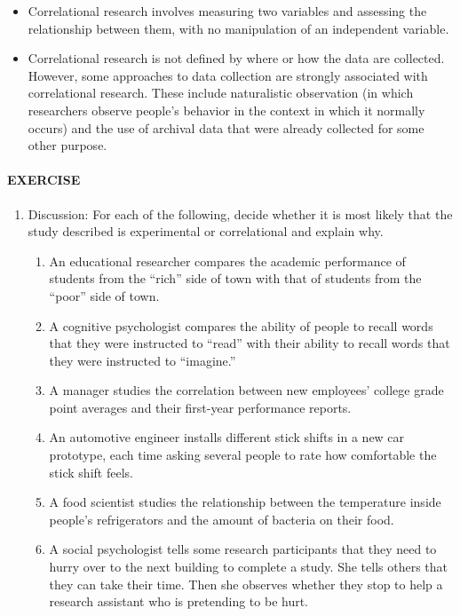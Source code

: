 \documentclass[
]{krantz}
\providecommand{\tightlist}{%
  \setlength{\itemsep}{0pt}\setlength{\parskip}{0pt}}
\begin{document}
\begin{itemize}
\tightlist
\item
  Correlational research involves measuring two variables and assessing the relationship between them, with no manipulation of an independent variable.
\item
  Correlational research is not defined by where or how the data are collected. However, some approaches to data collection are strongly associated with correlational research. These include naturalistic observation (in which researchers observe people's behavior in the context in which it normally occurs) and the use of archival data that were already collected for some other purpose.
\end{itemize}

\paragraph*{EXERCISE}\label{exercise-3}

\begin{enumerate}
\def\labelenumi{\arabic{enumi}.}
\tightlist
\item
  Discussion: For each of the following, decide whether it is most likely that the study described is experimental or correlational and explain why.

  \begin{enumerate}
  \def\labelenumii{\alph{enumii}.}
  \tightlist
  \item
    An educational researcher compares the academic performance of students from the ``rich'' side of town with that of students from the ``poor'' side of town.
  \item
    A cognitive psychologist compares the ability of people to recall words that they were instructed to ``read'' with their ability to recall words that they were instructed to ``imagine.''
  \item
    A manager studies the correlation between new employees' college grade point averages and their first-year performance reports.
  \item
    An automotive engineer installs different stick shifts in a new car prototype, each time asking several people to rate how comfortable the stick shift feels.
  \item
    A food scientist studies the relationship between the temperature inside people's refrigerators and the amount of bacteria on their food.
  \item
    A social psychologist tells some research participants that they need to hurry over to the next building to complete a study. She tells others that they can take their time. Then she observes whether they stop to help a research assistant who is pretending to be hurt.
  \end{enumerate}
\end{enumerate}
\end{document}
